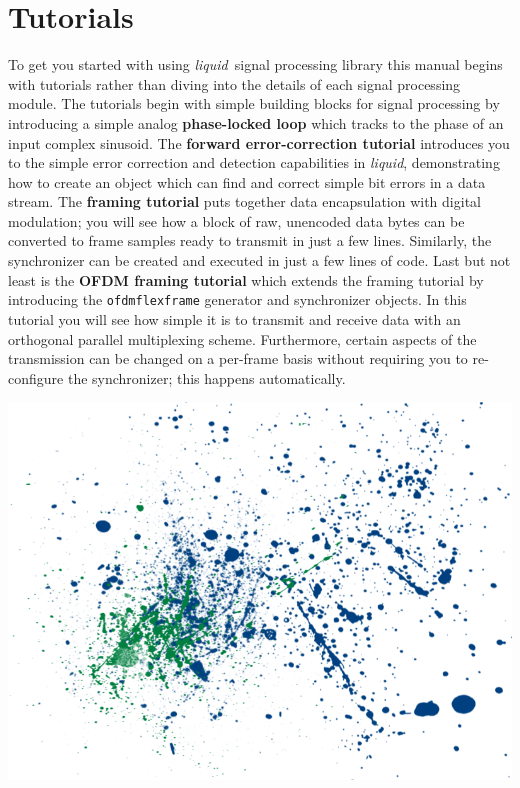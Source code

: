 \documentclass[11pt,twoside]{article}
\newcommand{\liquid}{{\it liquid}}
\begin{document}
\vfill





%
%
\newpage
\part{Tutorials}
\label{part:tutorials}

\bigskip
\noindent
To get you started with using \liquid\ signal processing library
this manual begins with tutorials rather than diving into the details of
each signal processing module.
%
The tutorials begin with simple building blocks for signal processing by
introducing a simple analog {\bf phase-locked loop} which tracks to the
phase of an input complex sinusoid.
%
%
The {\bf forward error-correction tutorial}
introduces you to the simple error correction and detection
capabilities in \liquid, demonstrating how to create an object which can
find and correct simple bit errors in a data stream.
%
The {\bf framing tutorial}
puts together data encapsulation with digital
modulation; you will see how a block of raw, unencoded data bytes can be
converted to frame samples ready to transmit in just a few lines.
Similarly, the synchronizer can be created and executed in just a few
lines of code.
%
Last but not least is the {\bf OFDM framing tutorial}
which extends the framing tutorial by introducing the
{\tt ofdmflexframe} generator and synchronizer objects.
In this tutorial you will see how simple it is to transmit and receive
data with an orthogonal parallel multiplexing scheme.
Furthermore, certain aspects of the transmission can be changed on a
per-frame basis without requiring you to re-configure the synchronizer;
this happens automatically.


\vfill

\includegraphics[width=\textwidth]{graphics/liquid_splatter_02.png}
\end{document}
